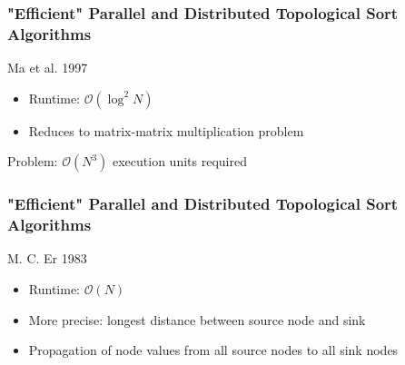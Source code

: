 \begin{frame}
\frametitle{"Efficient" Parallel and Distributed Topological Sort Algorithms}
Ma et al. 1997

\begin{itemize}
	\item Runtime: $\mathcal{O} (\log^2 N)$
	\item Reduces to matrix-matrix multiplication problem
\end{itemize}

\begin{block}{Problem:}
	$\mathcal{O} (N^3)$ execution units required
\end{block}


\end{frame}

\begin{frame}
\frametitle{"Efficient" Parallel and Distributed Topological Sort Algorithms}

M. C. Er 1983
\begin{itemize}
	\item Runtime: $\mathcal{O} (N)$
	\item More precise: longest distance between source node and sink
	\item Propagation of node values from all source nodes to all sink nodes
\end{itemize}


\end{frame}



